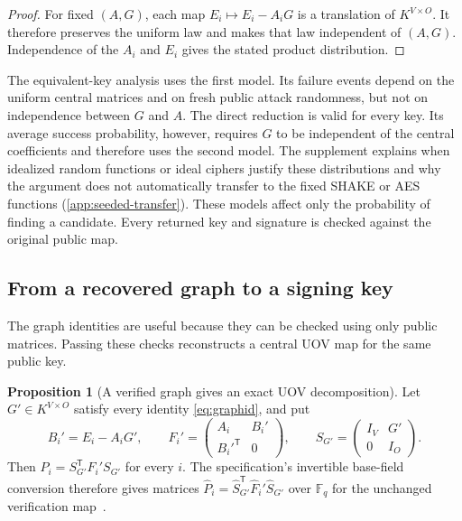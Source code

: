 \documentclass[11pt,a4paper]{article}
\theoremstyle{definition}
\newtheorem{proposition}[theorem]{Proposition}
\theoremstyle{remark}
\newcommand{\F}{\mathbb F}
\newcommand{\trans}{\mathsf T}
\begin{document}
\begin{proof}
For fixed $(A,G)$, each map $E_i\mapsto E_i-A_iG$ is a translation of
$K^{V\times O}$.  It therefore preserves the uniform law and makes that law
independent of $(A,G)$.  Independence of the $A_i$ and $E_i$ gives the stated
product distribution.
\end{proof}

The equivalent-key analysis uses the first model.  Its failure events depend
on the uniform central matrices and on fresh public attack randomness, but not
on independence between $G$ and $A$.  The direct reduction is valid for every
key.  Its average success probability, however, requires $G$ to be independent
of the central coefficients and therefore uses the second model.  The
supplement explains when idealized random functions or ideal ciphers justify
these distributions and why the argument does not automatically transfer to
the fixed SHAKE or AES functions (\cref{app:seeded-transfer}).  These models
affect only the probability of finding a candidate.  Every returned key and
signature is checked against the original public map.

\subsection{From a recovered graph to a signing key}

The graph identities are useful because they can be checked using only public
matrices.  Passing these checks reconstructs a central UOV map for the same
public key.

\begin{proposition}[A verified graph gives an exact UOV decomposition]\label{prop:verified-key}
Let $G'\in K^{V\times O}$ satisfy every identity \eqref{eq:graphid}, and put
\[
 B_i'=E_i-A_iG',\qquad
 F_i'=\begin{pmatrix}A_i&B_i'\\{B_i'}^{\trans}&0\end{pmatrix},\qquad
 S_{G'}=\begin{pmatrix}I_V&G'\\0&I_O\end{pmatrix}.
\]
Then $P_i=S_{G'}^{\trans}F_i'S_{G'}$ for every $i$.  The specification's
invertible base-field conversion therefore gives matrices
$\widehat P_i=\widehat S_{G'}^{\trans}\widehat F_i'\widehat S_{G'}$ over
$\F_q$ for the unchanged verification map~\cite[Sec.~4.1]{QRUOVSpec}.
\end{proposition}
\end{document}
